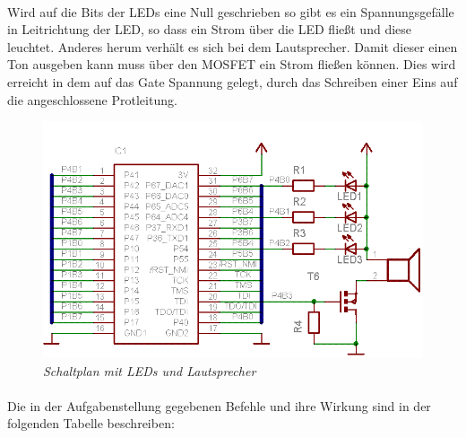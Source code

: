 \paragraph*{}
Wird auf die Bits der LEDs eine Null geschrieben so gibt es ein 
Spannungsgefälle in Leitrichtung der LED, so dass ein Strom über die LED 
fließt und diese leuchtet. Anderes herum verhält es sich bei dem 
Lautsprecher. Damit dieser einen Ton ausgeben kann muss über den MOSFET
ein Strom fließen können. Dies wird erreicht in dem auf das Gate Spannung 
gelegt, durch das Schreiben einer Eins auf die angeschlossene Protleitung.

\begin{figure}
\centering
\includegraphics[width=\textwidth]{img/mikrocontrollerUNDled.png}
\caption{\em \small Schaltplan mit LEDs und Lautsprecher}
\end{figure}

\paragraph{} Die in der Aufgabenstellung gegebenen Befehle und 
ihre Wirkung sind in der folgenden Tabelle beschreiben:

